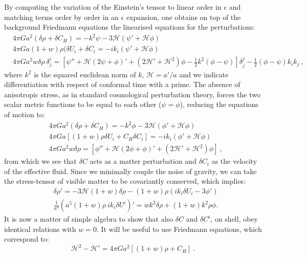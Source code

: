 \documentclass[amsmath,amssymb,11pt]{article}
\begin{document}
By computing the variation of the Einstein's tensor to linear order in $\epsilon$ and matching terms order by order in an $\epsilon$ expansion, one obtains on top of the background Friedmann equations the linearised equations for the perturbations:
\begin{align}
    &4\pi G a^2 (\delta\rho + \delta C_H)= -k^2 \psi- 3\mathcal{H}(\psi'+\mathcal{H}\phi) \\
    &4\pi G a (1+w)\rho (\delta U_i+\delta C_i  = - i k_i (\psi' +\mathcal{H \phi}) \\
    &4\pi G a^2 w \delta\rho \ \delta^i_j  = \left[\psi'' + \mathcal{H}(2\psi + \phi)' + (2\mathcal{H}'+\mathcal{H}^2) \phi-\frac{1}{2}k^2 (\phi-\psi) \right] \delta^j_j - \frac{1}{2}(\phi-\psi)k_i k_j \ ,
\end{align}
where $k^2$ is the squared euclidean norm of $k$, $\mathcal{H}=a'/a$ and we indicate differentiation with respect of conformal time with a prime. The absence of anisotropic stress, as in standard cosmological perturbation theory, forces the two scalar metric functions to be equal to each other ($\psi=\phi$), reducing the equations of motion to:
\begin{align}
    &4\pi G a^2 (\delta\rho + \delta C_H) = -k^2 \phi- 3\mathcal{H}(\phi'+\mathcal{H}\phi) \label{eq:cons_inh} \\
    &4\pi G a \left[(1+w)\rho \delta U_i+ C_H \delta C_i \right]  = - i k_i (\phi' +\mathcal{H \phi})\label{eq:momcons_inh} \\
    &4\pi G a^2 w \delta\rho   = \left[\phi'' + \mathcal{H}(2\phi + \phi)' + (2\mathcal{H}'+\mathcal{H}^2) \phi \right] \ \label{eq:eom_inh} ,
\end{align}
from which we see that $\delta C$ acts as a matter perturbation and $\delta C_i$ as the velocity of the effective fluid. Since we minimally couple the noise of gravity, we can take the stress-tensor of visible matter to be covariantly conserved, which implies:
\begin{align}
\label{eq:continuity}
    &\delta \rho ' = -3 \mathcal{H}(1+w) \delta \rho - (1+w) \rho (i k_i \delta U_i - 3\phi') \\
\label{eq:euler}
    &\frac{1}{a^4}\left(a^5 (1+w) \rho  \ i k_i \delta U^i \right)'= w k^2 \delta \rho + (1+w) k^2 \rho \phi  .
\end{align}
It is now a matter of simple algebra to show that also $\delta C$ and $\delta C^i$, on shell, obey identical relations with $w=0$. It will be useful to use Friedmann equations, which correspond to:
\begin{equation}
\label{eq:friedmann_back}
    \mathcal{H}^2-\mathcal{H}' = 4\pi G a^2 \left[(1+w)\rho + C_H \right] \ .
\end{equation}
\end{document}
